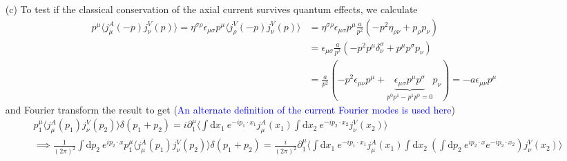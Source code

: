 \documentclass[10pt, a4paper]{article}
\begin{document}
{\begin{enumerate}
\begin{align*}
    &= (\partial_\mu \bar{\psi}) \gamma^1 \gamma^0 \gamma^{\mu} \psi +  \bar{\psi} \gamma^1 \gamma^0 \gamma^{\mu} (\partial_\mu \psi) = 0
  \end{align*}
  where we used the property $\epsilon_{\mu\nu} \gamma^{\nu} =\eta_{\mu \sigma} \gamma^1 \gamma^0 \gamma^{\sigma}$, the classical equation of motion for a free massless fermion field $0 = \gamma^1 \gamma^0 \gamma^{\mu} \partial_\mu \psi$ and its conjugate $0 =  \partial_\mu \psi^\dagger \gamma^0 \gamma^1 \gamma^0 \gamma^{\mu} \gamma^0 = \partial_\mu \bar{\psi} \gamma^1 \gamma^0 \gamma^{\mu} \gamma^0$. We explicitly check 
  \begin{align*}
    \gamma^{1} &= \epsilon_{01} \gamma^{1} =  \eta_{00} \gamma^1 \gamma^0 \gamma^{0} = (\eta_{00}\eta^{00}) \gamma^1 = \gamma^1,\\
    -\gamma^{0} &= \epsilon_{10} \gamma^{0} = \eta_{11} \gamma^1 \gamma^0 \gamma^{1} = -(\eta_{11} \eta^{11})\gamma^0 = -\gamma^0.
  \end{align*}
  We conclude that the classical equations of motion imply both the classical conservation of the vector current and the classical conservation of the axial current. 
  \item[(c)] To test if the classical conservation of the axial current survives quantum effects, we calculate 
  \begin{align*}
    p^\mu \langle j^A_\mu (-p) j^V_\nu (p) \rangle = \eta^{\sigma \rho}\epsilon_{\mu\sigma}p^\mu \langle j^V_\rho (-p) j^V_\nu (p) \rangle &= \eta^{\sigma \rho}\epsilon_{\mu\sigma}p^\mu \frac{a}{p^2}\left(-p^2\eta_{\rho\nu} + p_\rho p_\nu\right)\\
    &= \epsilon_{\mu\sigma} \frac{a}{p^2}\left(-p^2 p^\mu \delta_{\nu}^{\sigma} + p^\mu p^\sigma p_\nu \right)\\
    &= \frac{a}{p^2}(-p^2  \epsilon_{\mu\nu} p^\mu + \underbrace{\epsilon_{\mu\sigma} p^\mu p^\sigma}_{p^0 p^1 - p^1 p^0 = 0} p_\nu ) = -a\epsilon_{\mu\nu} p^\mu
  \end{align*}
  and Fourier transform the result to get (\textcolor{blue}{An alternate definition of the current Fourier modes is used here})
  \begin{align*}
      &p_1^\mu \langle j^A_\mu (p_1) j^V_\nu (p_2) \rangle \delta(p_1 + p_2) = i \partial^\mu_1 \langle \int \text{d}x_1 \ e^{- i p_1 \cdot x_1} j_{\mu}^{A}(x_1)  \int \text{d}x_2\ e^{- i p_2 \cdot x_2} j_{\nu}^{V}(x_2) \rangle\\
      &\implies 
      \frac{1}{(2\pi)^2}\int \text{d}p_2\ e^{i p_2 \cdot x} p_1^\mu \langle j^A_\mu (p_1) j^V_\nu (p_2) \rangle \delta(p_1 + p_2) = \frac{i}{(2\pi)^2} \partial^\mu_1 \langle \int \text{d}x_1 \ e^{- i p_1 \cdot x_1} j_{\mu}^{A}(x_1)  \int \text{d}x_2\ \left(\int \text{d}p_2\ e^{i p_2 \cdot x}  e^{- i p_2 \cdot x_2} \right) j_{\nu}^{V}(x_2) \rangle\\

\end{align*}
\end{enumerate}}
\end{document}
